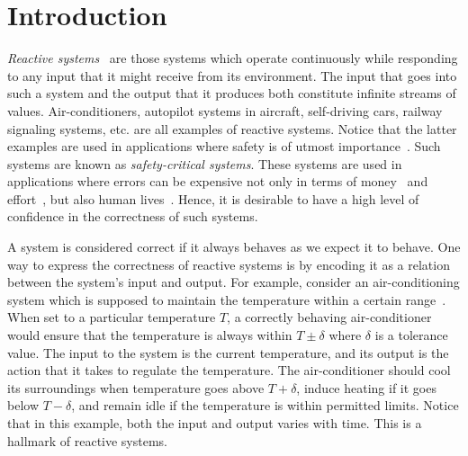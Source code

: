 \chapter{Introduction} \label{ch:intro}


\emph{Reactive systems}~\cite{harel1984reactive} are those systems
which operate continuously while responding to any input that it might
receive from its environment.
The input that goes into such a system and the output that it produces both
constitute infinite streams of values.
Air-conditioners, autopilot systems in aircraft, self-driving cars,
railway signaling systems, etc. are all examples of reactive systems.
Notice that the latter examples are used in applications where safety
is of utmost importance~\cite{baker2019timeline}.
Such systems are known as \emph{safety-critical systems}.
These systems are used in applications where errors can be
expensive not only in terms of money~\cite{pentium1995anatomy} and
effort~\cite{mcquaid2012software}, but also human
lives~\cite{arianeV1997analysis,gulf1992patriot}.
Hence, it is desirable to have a high level of confidence in the
correctness of such systems.

A system is considered correct if it always behaves as we expect it
to behave.
One way to express the correctness of reactive systems is by encoding
it as a relation between the system's input and output.
For example, consider an air-conditioning system
which is supposed to maintain the temperature within a certain
range~\cite{janitor2023rv}.
When set to a particular temperature $T$, a correctly behaving
air-conditioner would ensure that the temperature is always within
$T±δ$ where $δ$ is a tolerance value.
The input to the system is the current temperature, and its output is
the action that it takes to regulate the temperature.
The air-conditioner should cool its surroundings when temperature goes above
$T+δ$, induce heating if it goes below $T-δ$, and remain idle if the
temperature is within permitted limits.
Notice that in this example, both the input and output varies with
time. This is a hallmark of reactive systems.

